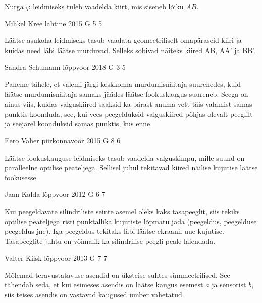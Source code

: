 \documentclass[11pt, twoside]{article}
\begin{document}
{{\ifHint
Nurga $\varphi$ leidmiseks tuleb vaadelda kiirt, mis siseneb lõiku $AB$.
\fi
}

{Mihkel Kree} %
{lahtine} %
{2015} %
{G 5} %
{5} %
{

\ifHint
Läätse asukoha leidmiseks tasub vaadata geomeetriliselt omapäraseid kiiri ja kuidas need läbi läätse murduvad. Selleks sobivad näiteks kiired AB, AA' ja BB'.
\fi
}

{Sandra Schumann} %
{lõppvoor} %
{2018} %
{G 3} %
{5} %
{

\ifHint
Paneme tähele, et valemi järgi keskkonna murdumisnäitaja suurenedes, kuid läätse murdumisnäitaja samaks jäädes läätse fookuskaugus suureneb. Seega on ainus viis, kuidas valguskiired saaksid ka pärast anuma vett täis valamist samas punktis koonduda, see, kui vees peegelduksid valguskiired põhjas olevalt peeglilt ja seejärel koonduksid samas punktis, kus enne.
\fi
}

{Eero Vaher} %
{piirkonnavoor} %
{2015} %
{G 8} %
{6} %
{

\ifHint
Läätse fookuskauguse leidmiseks tasub vaadelda valguskimpu, mille suund on paralleelne optilise peateljega. Sellisel juhul tekitavad kiired näilise kujutise läätse fookusesse.
\fi
}

{Jaan Kalda} %
{lõppvoor} %
{2012} %
{G 6} %
{7} %
{

\ifHint
Kui peegeldavate silindriliste seinte asemel oleks kaks tasapeeglit, siis
tekiks optilise peateljega risti punktallika kujutiste lõpmatu jada (peegeldus, peegelduse peegeldus jne). Iga peegeldus tekitaks läbi läätse ekraanil uue kujutise. Tasapeeglite juhtu on võimalik ka silindrilise peegli peale laiendada.
\fi
}

{Valter Kiisk} %
{lõppvoor} %
{2013} %
{G 7} %
{7} %
{

\ifHint
Mõlemad teravustatavuse asendid on üksteise suhtes sümmeetrilised. See tähendab seda, et kui esimeses asendis on läätse kaugus esemest $a$ ja sensorist $b$, siis teises asendis on vastavad kaugused ümber vahetatud.
\fi
}

}
\end{document}
